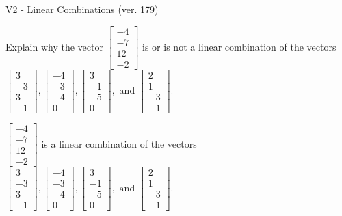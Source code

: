 \begin{exercise}
  \begin{exerciseTitle}V2 - Linear Combinations (ver. 179)\end{exerciseTitle}
  \begin{exerciseStatement}
    Explain why the vector \(\left[\begin{array}{c}
-4 \\
-7 \\
12 \\
-2
\end{array}\right]\)  is or is not a linear 
	combination of the vectors \(\left[\begin{array}{c}
3 \\
-3 \\
3 \\
-1
\end{array}\right] , \left[\begin{array}{c}
-4 \\
-3 \\
-4 \\
0
\end{array}\right] , \left[\begin{array}{c}
3 \\
-1 \\
-5 \\
0
\end{array}\right] , \text{ and } \left[\begin{array}{c}
2 \\
1 \\
-3 \\
-1
\end{array}\right]\).
	


  \end{exerciseStatement}
  \begin{exerciseAnswer}
   \(\left[\begin{array}{c}
-4 \\
-7 \\
12 \\
-2
\end{array}\right]\) 
  	 is  
	a linear combination of the vectors \(\left[\begin{array}{c}
3 \\
-3 \\
3 \\
-1
\end{array}\right] , \left[\begin{array}{c}
-4 \\
-3 \\
-4 \\
0
\end{array}\right] , \left[\begin{array}{c}
3 \\
-1 \\
-5 \\
0
\end{array}\right] , \text{ and } \left[\begin{array}{c}
2 \\
1 \\
-3 \\
-1
\end{array}\right]\).


\end{exerciseAnswer}
\end{exercise}
